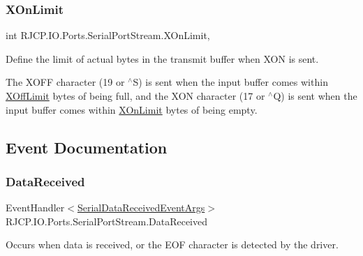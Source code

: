 \subsubsection{\texorpdfstring{XOnLimit}{XOnLimit}}
{\footnotesize\ttfamily int R\+J\+C\+P.\+I\+O.\+Ports.\+Serial\+Port\+Stream.\+X\+On\+Limit\hspace{0.3cm}{\ttfamily [get]}, {\ttfamily [set]}}



Define the limit of actual bytes in the transmit buffer when X\+ON is sent. 

The X\+O\+FF character (19 or $^\wedge$S) is sent when the input buffer comes within \mbox{\hyperlink{class_r_j_c_p_1_1_i_o_1_1_ports_1_1_serial_port_stream_a788b734b7f7ae0ea73d3d87ddefccb16}{X\+Off\+Limit}} bytes of being full, and the X\+ON character (17 or $^\wedge$Q) is sent when the input buffer comes within \mbox{\hyperlink{class_r_j_c_p_1_1_i_o_1_1_ports_1_1_serial_port_stream_a9c35bb6f9e65e8a909f7148e6dbcde54}{X\+On\+Limit}} bytes of being empty. 

\subsection{Event Documentation}
\mbox{\label{class_r_j_c_p_1_1_i_o_1_1_ports_1_1_serial_port_stream_a05dd2c8da5aacc2adb8653385c1bc0cd}} 
\subsubsection{\texorpdfstring{DataReceived}{DataReceived}}
{\footnotesize\ttfamily Event\+Handler$<$\mbox{\hyperlink{class_r_j_c_p_1_1_i_o_1_1_ports_1_1_serial_data_received_event_args}{Serial\+Data\+Received\+Event\+Args}}$>$ R\+J\+C\+P.\+I\+O.\+Ports.\+Serial\+Port\+Stream.\+Data\+Received}



Occurs when data is received, or the E\+OF character is detected by the driver. 

\mbox{\label{class_r_j_c_p_1_1_i_o_1_1_ports_1_1_serial_port_stream_add63e9fe00963eead46eef119dc2c934}} 
